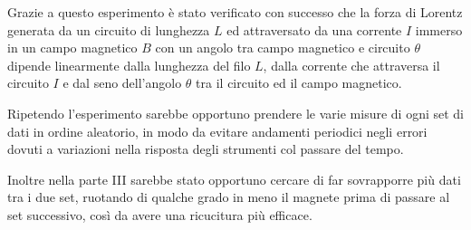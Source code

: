 {\fontsize{12}{14}\selectfont 

Grazie a questo esperimento è stato verificato con successo che la forza di Lorentz generata da un circuito di lunghezza $L$ ed attraversato da una corrente $I$ immerso in un campo magnetico $B$ con un angolo tra campo magnetico e circuito $\theta$ dipende linearmente dalla lunghezza del filo $L$, dalla corrente che attraversa il circuito $I$ e dal seno dell'angolo $\theta$ tra il circuito ed il campo magnetico.
\par
Ripetendo l'esperimento sarebbe opportuno prendere le varie misure di ogni set di dati in ordine aleatorio, in modo da evitare andamenti periodici negli errori dovuti a variazioni nella risposta degli strumenti col passare del tempo.
\par
Inoltre nella parte III sarebbe stato opportuno cercare di far sovrapporre più dati tra i due set, ruotando di qualche grado in meno il magnete prima di passare al set successivo, così da avere una ricucitura più efficace.


\par}
